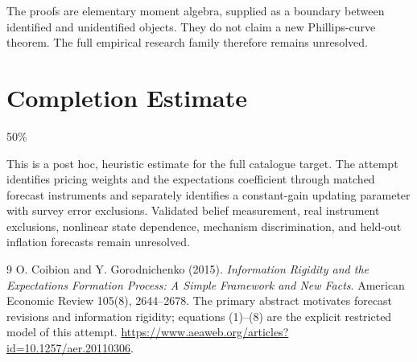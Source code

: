 \documentclass[11pt,a4paper]{article}
\begin{document}
The proofs are elementary moment algebra, supplied as a boundary between identified and unidentified objects. They do not claim a new Phillips-curve theorem. The full empirical research family therefore remains unresolved.

\section{Completion Estimate}
50\%

This is a post hoc, heuristic estimate for the full catalogue target.
The attempt identifies pricing weights and the expectations coefficient through matched forecast instruments and separately identifies a constant-gain updating parameter with survey error exclusions. Validated belief measurement, real instrument exclusions, nonlinear state dependence, mechanism discrimination, and held-out inflation forecasts remain unresolved.

\begin{thebibliography}{9}
 O. Coibion and Y. Gorodnichenko (2015).
\emph{Information Rigidity and the Expectations Formation Process: A Simple Framework and New Facts}.
American Economic Review 105(8), 2644--2678.
The primary abstract motivates forecast revisions and information rigidity; equations (1)--(8) are the explicit restricted model of this attempt.
\url{https://www.aeaweb.org/articles?id=10.1257/aer.20110306}.
\end{thebibliography}
\end{document}
